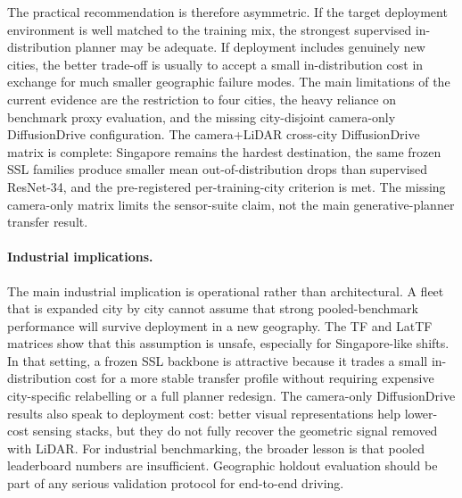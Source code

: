 The practical recommendation is therefore asymmetric. If the target deployment environment is well matched to the training mix, the strongest supervised in-distribution planner may be adequate. If deployment includes genuinely new cities, the better trade-off is usually to accept a small in-distribution cost in exchange for much smaller geographic failure modes. The main limitations of the current evidence are the restriction to four cities, the heavy reliance on benchmark proxy evaluation, and the missing city-disjoint camera-only DiffusionDrive configuration. The camera+LiDAR cross-city DiffusionDrive matrix is complete: Singapore remains the hardest destination, the same frozen SSL families produce smaller mean out-of-distribution drops than supervised ResNet-34, and the pre-registered per-training-city criterion is met. The missing camera-only matrix limits the sensor-suite claim, not the main generative-planner transfer result.

\paragraph{Industrial implications.}
The main industrial implication is operational rather than architectural. A fleet that is expanded city by city cannot assume that strong pooled-benchmark performance will survive deployment in a new geography. The TF and LatTF matrices show that this assumption is unsafe, especially for Singapore-like shifts. In that setting, a frozen SSL backbone is attractive because it trades a small in-distribution cost for a more stable transfer profile without requiring expensive city-specific relabelling or a full planner redesign. The camera-only DiffusionDrive results also speak to deployment cost: better visual representations help lower-cost sensing stacks, but they do not fully recover the geometric signal removed with LiDAR. For industrial benchmarking, the broader lesson is that pooled leaderboard numbers are insufficient. Geographic holdout evaluation should be part of any serious validation protocol for end-to-end driving.
